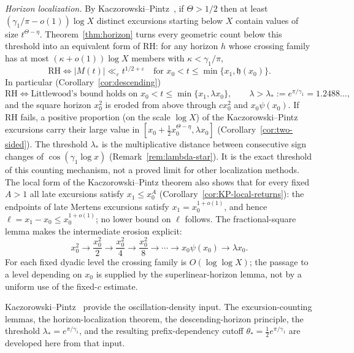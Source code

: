 \documentclass[11pt]{amsart}
\numberwithin{equation}{section}
\theoremstyle{plain}
\theoremstyle{definition}
\theoremstyle{remark}
\newcommand{\eps}{\varepsilon}
\begin{document}
\smallskip\noindent\emph{Horizon localization.} By
Kaczorowski--Pintz~\cite{KP86}, if $\Theta>1/2$ then at least
$(\gamma_1/\pi-o(1))\log X$ distinct excursions starting below $X$ contain
values of size $t^{\Theta-\eta}$. Theorem~\ref{thm:horizon} turns every
geometric count below this threshold into an equivalent form of RH: for any
horizon $h$ whose crossing family has at most $(\kappa+o(1))\log X$ members
with $\kappa<\gamma_1/\pi$,
\[
\mathrm{RH}\iff |M(t)|\ll_\eps t^{1/2+\eps}\quad\text{for }x_0<t\le\min\{x_1,\mathfrak h(x_0)\}.
\]
In particular (Corollary~\ref{cor:descending})
\[
\mathrm{RH}\iff\text{Littlewood's bound holds on }x_0<t\le\min\{x_1,\lambda x_0\},
\qquad\lambda>\lambda_*:=e^{\pi/\gamma_1}=1.2488\ldots,
\]
and the square horizon $x_0^2$ is eroded from above through $cx_0^2$ and
$x_0\psi(x_0)$. If RH fails, a positive proportion (on the scale $\log X$) of the
Kaczorowski--Pintz excursions carry their large value in
$[x_0+\frac12x_0^{\Theta-\eta},\lambda x_0]$ (Corollary~\ref{cor:two-sided}). The threshold $\lambda_*$ is the multiplicative distance
between consecutive sign changes of $\cos(\gamma_1\log x)$
(Remark~\ref{rem:lambda-star}). It is the exact threshold of this counting mechanism, not a
proved limit for other localization methods. The local form of the
Kaczorowski--Pintz theorem also shows that for every fixed $A>1$ all late
excursions satisfy $x_1\le x_0^A$ (Corollary~\ref{cor:KP-local-returns}):
the endpoints of late Mertens excursions satisfy $x_1=x_0^{1+o(1)}$, and
hence $\ell=x_1-x_0\le x_0^{1+o(1)}$; no lower bound on $\ell$ follows.  The fractional-square lemma makes the
intermediate erosion explicit:
\[
x_0^2\longrightarrow \frac{x_0^2}{2}\longrightarrow
\frac{x_0^2}{4}\longrightarrow\frac{x_0^2}{8}\longrightarrow\cdots
\longrightarrow x_0\psi(x_0)\longrightarrow\lambda x_0.
\]
For each fixed dyadic level the crossing family is $O(\log\log X)$; the
passage to a level depending on $x_0$ is supplied by the superlinear-horizon
lemma, not by a uniform use of the fixed-$c$ estimate.

Kaczorowski--Pintz~\cite{KP86} provide the oscillation-density input.  The
excursion-counting lemmas, the horizon-localization theorem, the
descending-horizon principle, the threshold
$\lambda_*=e^{\pi/\gamma_1}$, and the resulting prefix-dependency cutoff
$\theta_*=\tfrac12e^{\pi/\gamma_1}$ are developed here from that input.
\end{document}
